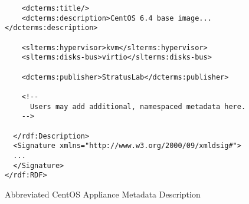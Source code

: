 \begin{figure}
\begin{center}
\begin{verbatim}
    <dcterms:title/>
    <dcterms:description>CentOS 6.4 base image...</dcterms:description>
    
    <slterms:hypervisor>kvm</slterms:hypervisor>
    <slterms:disks-bus>virtio</slterms:disks-bus>
    
    <dcterms:publisher>StratusLab</dcterms:publisher>

    <!--
      Users may add additional, namespaced metadata here. 
    -->    
    
  </rdf:Description>
  <Signature xmlns="http://www.w3.org/2000/09/xmldsig#">
  ...
  </Signature>
</rdf:RDF>
\end{verbatim}
\end{center}
\caption{Abbreviated CentOS Appliance Metadata Description}
\label{fig:metadata-example}
\end{figure}
